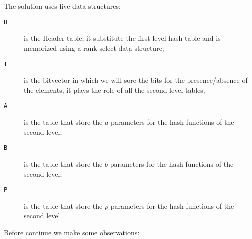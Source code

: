 \documentclass[a4paper]{article}
\begin{document}
\\
\\
The solution uses five data structures: 
\begin{description}
\item[\texttt{H}] is the Header table, it substitute the first level hash table and is memorized using a rank-select data structure;
\item[\texttt{T}] is the bitvector in which we will sore the bits for the presence/absence of the elements, it plays the role of all the second level tables;
\item[\texttt{A}] is the table that store the $a$ parameters for the hash functions of the second level;
\item[\texttt{B}] is the table that store the $b$ parameters for the hash functions of the second level;
\item[\texttt{P}] is the table that store the $p$ parameters for the hash functions of the second level.
\end{description}
Before continue we make some observations:
\end{document}
